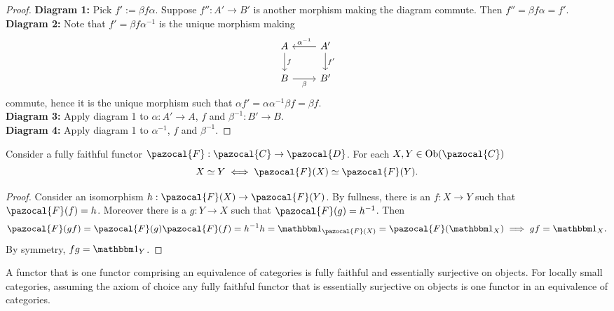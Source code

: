     \begin{proof}
        \textbf{Diagram 1:} Pick $f':= \beta f\alpha$. Suppose $f'': A'\rightarrow B'$ is another morphism making the diagram commute. Then $f'' = \beta f \alpha = f'$.\\
        \textbf{Diagram 2:} Note that $f' = \beta f \alpha^{-1}$ is the unique morphism making  
        $$
            \begin{tikzcd}
                A\arrow[d, "f"] & A'\arrow[l,"\alpha^{-1}",swap]\arrow[d,"f'"]\\
                B \arrow[r,"\beta",swap] & B'
            \end{tikzcd}
        $$
        commute, hence it is the unique morphism such that $ \alpha f' =\alpha\alpha^{-1}\beta f = \beta f$.\\
        \textbf{Diagram 3:} Apply diagram 1 to $\alpha : A'\rightarrow A $, $f$ and $\beta^{-1}: B'\rightarrow B$.\\
        \textbf{Diagram 4:} Apply diagram 1 to $\alpha^{-1}$, $f$ and $\beta^{-1}$.
    \end{proof}
    \begin{lemma}
        Consider a fully faithful functor $\pazocal{F}:\pazocal{C}\rightarrow \pazocal{D}$. For each $X,Y\in \Ob(\pazocal{C})$
            $$
                X\simeq Y \iff \pazocal{F}(X) \simeq \pazocal{F}(Y).
            $$
    \end{lemma}
    \begin{proof}
        Consider an isomorphism $h : \pazocal{F}(X)\rightarrow \pazocal{F}(Y)$. By fullness, there is an $f:X\rightarrow Y$ such that $\pazocal{F}(f)=h$. Moreover there is a $g:Y\rightarrow X$ such that $\pazocal{F}(g)=h^{-1}$. Then 
        $$\pazocal{F}(gf) = \pazocal{F}(g)\pazocal{F}(f)=h^{-1}h=\fone_{\pazocal{F}(X)} = \pazocal{F}(\fone_X) \implies gf = \fone_X.$$
        By symmetry, $fg = \fone_Y$.   
    \end{proof}
    \begin{theorem}\label{EquivOfCatIsFFFESO}
        A functor that is one functor comprising an equivalence of categories is fully faithful and essentially surjective on objects. For locally small categories, assuming the axiom of choice any fully faithful functor that is essentially surjective on objects is one functor in an equivalence of categories.  
    \end{theorem}
